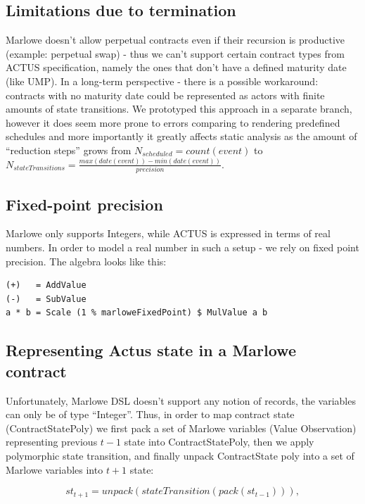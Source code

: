 \documentclass[runningheads]{llncs}
\begin{document}
\subsection{Limitations due to termination }

Marlowe doesn't allow perpetual contracts even if their recursion
is productive (example: perpetual swap) - thus we can't support certain
contract types from ACTUS specification, namely the ones that don't
have a defined maturity date (like UMP). In a long-term perspective
- there is a possible workaround: contracts with no maturity date
could be represented as actors with finite amounts of state transitions.
We prototyped this approach in a separate branch, however it does
seem more prone to errors comparing to rendering predefined schedules
and more importantly it greatly affects static analysis as the amount
of ``reduction steps'' grows from $N_{scheduled}=count(event)$
to $N_{stateTransitions}=\frac{max(date(event))-min(date(event))}{precision}$. 

\subsection{Fixed-point precision }

Marlowe only supports Integers, while ACTUS is expressed in terms
of real numbers. In order to model a real number in such a setup -
we rely on fixed point precision. The algebra looks like this: 
\begin{verbatim}
(+)   = AddValue
(-)   = SubValue
a * b = Scale (1 % marloweFixedPoint) $ MulValue a b
\end{verbatim}


\subsection{Representing Actus state in a Marlowe contract}

Unfortunately, Marlowe DSL doesn't support any notion of records,
the variables can only be of type ``Integer''. Thus, in order to
map contract state (ContractStatePoly) we first pack a set of Marlowe
variables (Value Observation) representing previous $t-1$ state into
ContractStatePoly, then we apply polymorphic state transition, and
finally unpack ContractState poly into a set of Marlowe variables
into $t+1$ state:

\noindent 
\begin{equation}
st_{t+1}=unpack(stateTransition(pack(st_{t-1}))),
\end{equation}
\end{document}
